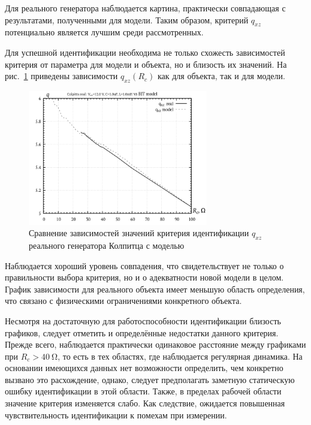 Для реального генератора наблюдается картина, практически совпадающая
с результатами, полученными для модели. Таким образом,
критерий $q_{xz}$ потенциально является лучшим среди рассмотренных.

Для успешной идентификации необходима не только схожесть зависимостей критерия
от параметра для модели и объекта, но и близость их значений.
На рис.~\ref{atu:f:colp_q_cml} приведены зависимости $q_{xz}(R_c)$
как для объекта, так и для модели.

\begin{figure}[htb!]
\centerline{\includegraphics[width=0.7\textwidth]{p/colp_q_cml.png} }
\caption{Сравнение зависимостей значений критерия идентификации $q_{xz}$ реального генератора Колпитца с моделью}
\label{atu:f:colp_q_cml}
\end{figure}

Наблюдается хороший уровень совпадения, что свидетельствует не только
о правильности выбора критерия, но и о адекватности новой модели в  целом.
График зависимости для реального объекта имеет меньшую область определения,
что связано с физическими ограничениями конкретного объекта.

Несмотря на достаточную для работоспособности идентификации
близость графиков, следует отметить и определённые недостатки
данного критерия. Прежде всего, наблюдается практически одинаковое расстояние
между графиками при $R_c > \SI{40}{\ohm}$, то есть в тех областях,
где наблюдается регулярная динамика.
На основании имеющихся данных нет возможности определить,
чем конкретно вызвано это расхождение,
однако, следует предполагать заметную статическую ошибку идентификации
в этой области. Также, в пределах рабочей области значение критерия
изменяется слабо. Как следствие, ожидается повышенная чувствительность
идентификации к помехам при измерении.




